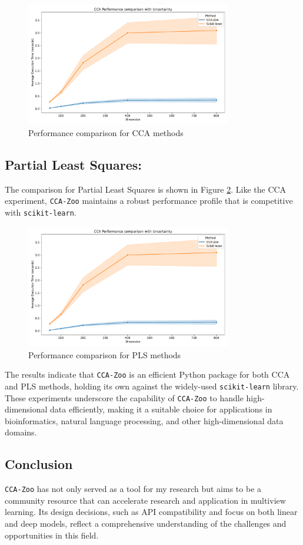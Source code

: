 \begin{figure}[h]
    \centering
    \includegraphics[width=0.8\textwidth]{figures/CCA_Speed_Benchmark}
    \caption{Performance comparison for CCA methods}
    \label{fig:cca_benchmark}
\end{figure}

\subsection{Partial Least Squares:}
The comparison for Partial Least Squares is shown in Figure \ref{fig:pls_benchmark}.
Like the CCA experiment, \texttt{CCA-Zoo} maintains a robust performance profile that is competitive with \texttt{scikit-learn}.

\begin{figure}[h]
    \centering
    \includegraphics[width=0.8\textwidth]{figures/CCA_Speed_Benchmark}
    \caption{Performance comparison for PLS methods}
    \label{fig:pls_benchmark}
\end{figure}

The results indicate that \texttt{CCA-Zoo} is an efficient Python package for both CCA and PLS methods, holding its own against the widely-used \texttt{scikit-learn} library.
These experiments underscore the capability of \texttt{CCA-Zoo} to handle high-dimensional data efficiently, making it a suitable choice for applications in bioinformatics, natural language processing, and other high-dimensional data domains.

\subsection{Conclusion}

\texttt{CCA-Zoo} has not only served as a tool for my research but aims to be a community resource that can accelerate research and application in multiview learning.
Its design decisions, such as API compatibility and focus on both linear and deep models, reflect a comprehensive understanding of the challenges and opportunities in this field.
